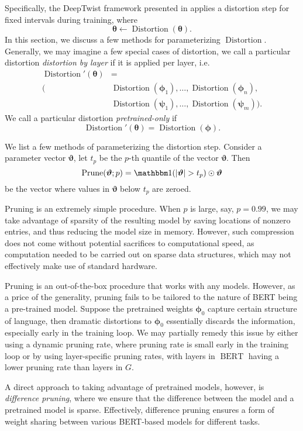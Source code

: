 \documentclass[10pt]{article}
\newcommand{\bert}{\operatorname{BERT}}
\newcommand{\distortion}{\operatorname{Distortion}}
\newcommand{\prune}{\operatorname{Prune}}
\newcommand{\btheta}{{\bm{\theta}}}
\newcommand{\bphi}{{\bm{\phi}}}
\newcommand{\bpsi}{{\bm{\psi}}}
\newcommand{\bvartheta}{{\bm{\vartheta}}}
\begin{document}
Specifically, the DeepTwist framework presented in  applies
a distortion step for fixed intervals during training, where \[
\btheta \gets \distortion(\btheta). 
\]
In this section, we discuss a few methods for parameterizing $\distortion$.
Generally, we may imagine a few special cases of distortion, we call a
particular distortion \emph{distortion by layer} if it is applied per layer,
i.e. \begin{align*}
\distortion'(\btheta) &= \\
(&\distortion(\bphi_1),\ldots,\distortion(\bphi_n),\\
&\distortion(\bpsi_1),\ldots, \distortion(\bpsi_m)).
\end{align*}
We call a particular distortion \emph{pretrained-only} if \[
\distortion'(\btheta) = \distortion(\bphi).
\]

We list a few methods of parameterizing the distortion step. 
 Consider a parameter vector $\bvartheta$, let
  $t_p$ be the $p$-th quantile of the vector $\bvartheta$. Then \[
  \prune(\bvartheta; p) = \one(|\bvartheta| > t_p) \odot \bvartheta
  \]
  be the vector where values in $\bvartheta$ below $t_p$ are zeroed. 
  
  Pruning is an extremely simple procedure. When $p$ is large, say, $p=0.99$,
  we may take advantage of sparsity of the resulting model by saving locations
  of nonzero entries, and thus reducing the model size in memory. However,
  such compression does not come without potential sacrifices to computational
  speed, as computation needed to be carried out on sparse data structures,
  which may not effectively make use of standard hardware.
  
  Pruning is an out-of-the-box procedure that works with any models. However,
  as a price of the generality, pruning fails to be tailored to the nature of
  BERT being a pre-trained model. Suppose the pretrained weights $\bphi_0 $
  capture certain structure of language, then dramatic distortions to
  $\bphi_0$ essentially discards the information, especially early in the
  training loop. We may partially remedy this issue by either using a dynamic
  pruning rate, where pruning rate is small early in the training loop or by
  using layer-specific pruning rates, with layers in $\bert$ having a lower
  pruning rate than layers in $G$. 
  
  A direct approach to taking advantage of pretrained models, however, is
  \emph{difference pruning}, where we ensure that the difference between the
  model and a pretrained model is sparse. Effectively, difference pruning
  ensures a form of weight sharing between various BERT-based models for
  different tasks.
  
\end{document}
